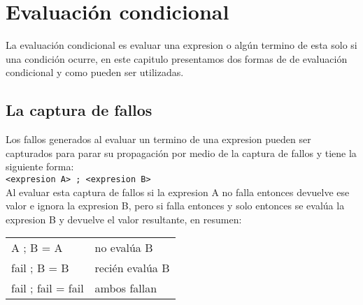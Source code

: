 
\titlespacing{\subsection}{0pt}{10pt}{0pt}

\chapter{Evaluación condicional}
   La evaluación condicional es evaluar una expresion o algún termino de esta solo si una condición ocurre, en este capitulo presentamos dos formas de de evaluación condicional y como pueden ser utilizadas.
   
   \section{La captura de fallos}
      Los fallos generados al evaluar un termino de una expresion pueden ser capturados para parar su propagación por medio de la captura de fallos y tiene la siguiente forma:
      \\
      
      \texttt{<expresion A>~; <expresion B>}
      \\
      
      Al evaluar esta captura de fallos si la expresion A no falla entonces devuelve ese valor e ignora la expresion B, pero si falla entonces y solo entonces se evalúa la expresion B y devuelve el valor resultante, en resumen:
      
      \begin{longtable}[c]{ll}
         A ; B = A & no evalúa B\\
         fail ; B = B & recién evalúa B\\
         fail ; fail = fail & ambos fallan\\
      \end{longtable}
      
